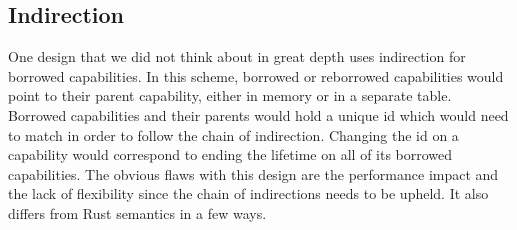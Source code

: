 \subsection{Indirection}
One design that we did not think about in great depth uses indirection for borrowed capabilities.
In this scheme, borrowed or reborrowed capabilities would point to their parent capability, either in memory or in a separate table.
Borrowed capabilities and their parents would hold a unique id which would need to match in order to follow the chain of indirection.
Changing the id on a capability would correspond to ending the lifetime on all of its borrowed capabilities.
The obvious flaws with this design are the performance impact and the lack of flexibility since the chain of indirections needs to be upheld.
It also differs from Rust semantics in a few ways.

